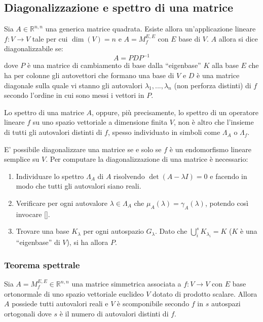 \vspace{10pt}
\subsection{Diagonalizzazione e spettro di una matrice} \label{subsec:linappdiag}
    Sia $A \in \mathbb{R}^{n, n}$ una generica matrice quadrata. Esiste allora un'applicazione lineare $f: V \rightarrow V$ tale per cui $\dim(V) = n$ e $A = M_{f}^{E, E}$ con $E$ base di $V$. $A$ allora si dice diagonalizzabile se:
    \[
        A = PDP^{-1}
    \]
    dove $P$ è una matrice di cambiamento di base dalla ``eigenbase'' $K$ alla base $E$ che ha per colonne gli autovettori che formano una base di $V$ e $D$ è una matrice diagonale sulla quale vi stanno gli autovalori $\lambda_1, ..., \lambda_n$ (non perforza distinti) di $f$
    secondo l'ordine in cui sono messi i vettori in $P$.

    \vspace{10pt}
    Lo spettro di una matrice $A$, oppure, più precisamente, lo spettro di un operatore lineare $f$ su uno spazio vettoriale a dimensione finita $V$, non è altro che l'insieme di tutti gli autovalori distinti di $f$, spesso
    individuato in simboli come $\Lambda_{A}$ o $\Lambda_{f}$.

    \vspace{10pt}
    E' possibile diagonalizzare una matrice se e solo se $f$ è un endomorfismo lineare semplice su $V$.
    Per computare la diagonalizzazione di una matrice è necessario:
    \begin{enumerate}[label=(\arabic*)]
        \item Individuare lo spettro $\Lambda_{A}$ di $A$ risolvendo $\det(A - \lambda I) = 0$ e facendo in modo che tutti gli autovalori siano reali.
        \item Verificare per ogni autovalore $\lambda \in \Lambda_{A}$ che $\mu_{A}(\lambda) = \gamma_{A}(\lambda)$, potendo così invocare [].
        \item Trovare una base $K_{\lambda}$ per ogni autospazio $G_{\lambda}$. Dato che $\displaystyle \bigcup_{i}^{s} K_{\lambda_i} = K$ ($K$ è una ``eigenbase'' di $V$), si ha allora $P$.
    \end{enumerate}

    \vspace{10pt}
    \subsubsection{Teorema spettrale} \label{subsubsec:linappspectralthm}
    \begin{theorem}
        Sia $A = M_{f}^{E, E} \in \mathbb{R}^{n, n}$ una matrice simmetrica associata a $f: V \rightarrow V$ con $E$ base ortonormale di uno spazio vettoriale euclideo $V$ dotato di prodotto scalare. 
        Allora $A$ possiede tutti autovalori reali e $V$ è scomponibile secondo $f$ in $s$ autospazi ortogonali dove $s$ è il numero di autovalori distinti di $f$.
    \end{theorem}

